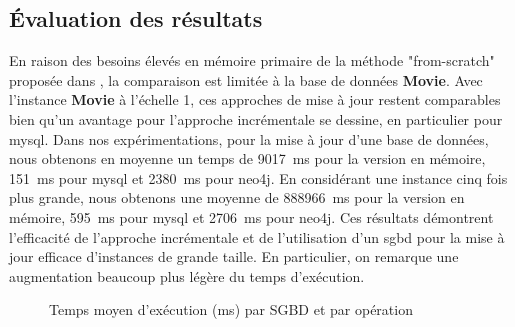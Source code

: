 \subsection{Évaluation des résultats}
En raison des besoins élevés en mémoire primaire de la méthode "from-scratch" proposée dans \cite{chabinConsistentUpdatingDatabases2020}, la comparaison est limitée à la base de données \textbf{Movie}.
Avec l'instance \textbf{Movie} à l'échelle 1, ces approches de mise à jour restent comparables bien qu'un avantage pour l'approche incrémentale se dessine, en particulier pour \gls{mysql}.
Dans nos expérimentations, pour la mise à jour d'une base de données, nous obtenons en moyenne un temps de \SI{9017}{\ms} pour la version en mémoire, \SI{151}{\ms} pour \gls{mysql} et \SI{2380}{\ms} pour \gls{neo4j}.
En considérant une instance cinq fois plus grande, nous obtenons une moyenne de \SI{888966}{\ms} pour la version en mémoire, \SI{595}{\ms} pour \gls{mysql} et \SI{2706}{\ms} pour \gls{neo4j}.
Ces résultats démontrent l'efficacité de l'approche incrémentale et de l'utilisation d'un \gls{sgbd} pour la mise à jour efficace d'instances de grande taille.
En particulier, on remarque une augmentation beaucoup plus légère du temps d'exécution.

\begin{figure}[htb]
    \centering
    \caption{Temps moyen d'exécution (\si{\ms}) par SGBD et par opération}
    \label{figure:update:xp:db}
\end{figure}

